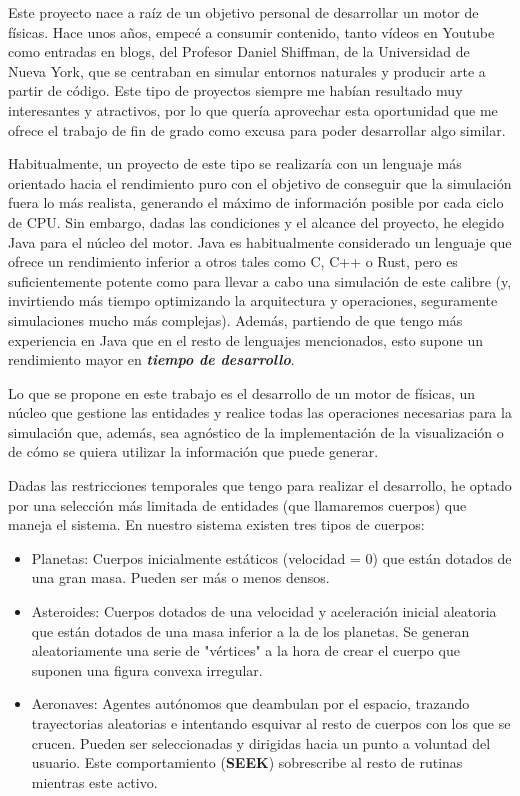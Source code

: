 
Este proyecto nace a raíz de un objetivo personal de desarrollar un motor de físicas. Hace unos años, empecé a consumir contenido, tanto vídeos en Youtube como entradas en blogs, del Profesor Daniel Shiffman, de la Universidad de Nueva York, que se centraban en simular entornos naturales y producir arte a partir de código. Este tipo de proyectos siempre me habían resultado muy interesantes y atractivos, por lo que quería aprovechar esta oportunidad que me ofrece el trabajo de fin de grado como excusa para poder desarrollar algo similar.

Habitualmente, un proyecto de este tipo se realizaría con un lenguaje más orientado hacia el rendimiento puro con el objetivo de conseguir que la simulación fuera lo más realista, generando el máximo de información posible por cada ciclo de CPU.
Sin embargo, dadas las condiciones y el alcance del proyecto, he elegido Java para el núcleo del motor.
Java es habitualmente considerado un lenguaje que ofrece un rendimiento inferior a otros tales como C, C++ o Rust, pero es suficientemente potente como para llevar a cabo una simulación de este calibre (y, invirtiendo más tiempo optimizando la arquitectura y operaciones, seguramente simulaciones mucho más complejas). Además, partiendo de que tengo más experiencia en Java que en el resto de lenguajes mencionados, esto supone un rendimiento mayor en \textbf{\textit{tiempo de desarrollo}}. 

Lo que se propone en este trabajo es el desarrollo de un motor de físicas, un núcleo que gestione las entidades y realice todas las operaciones necesarias para la simulación que, además, sea agnóstico de la implementación de la visualización o de cómo se quiera utilizar la información que puede generar.

Dadas las restricciones temporales que tengo para realizar el desarrollo, he optado por una selección más limitada de entidades (que llamaremos cuerpos) que maneja el sistema. En nuestro sistema existen tres tipos de cuerpos: 
\begin{itemize}
    \item Planetas: Cuerpos inicialmente estáticos (velocidad = 0) que están dotados de una gran masa. Pueden ser más o menos densos.

    \item Asteroides: Cuerpos dotados de una velocidad y aceleración inicial aleatoria que están dotados de una masa inferior a la de los planetas. Se generan aleatoriamente una serie de "vértices" a la hora de crear el cuerpo que suponen una figura convexa irregular.

    \item Aeronaves: Agentes autónomos que deambulan por el espacio, trazando trayectorias aleatorias e intentando esquivar al resto de cuerpos con los que se crucen. Pueden ser seleccionadas y dirigidas hacia un punto a voluntad del usuario. Este comportamiento (\textbf{SEEK}) sobrescribe al resto de rutinas mientras este activo.
\end{itemize}




